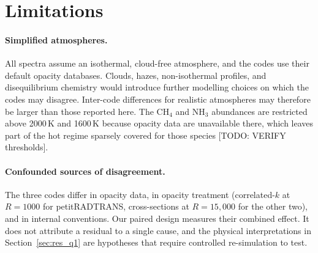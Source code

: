 



\section{Limitations}
\label{sec:limitations}

\paragraph{Simplified atmospheres.}
All spectra assume an isothermal, cloud-free atmosphere, and the codes use their default opacity databases.
Clouds, hazes, non-isothermal profiles, and disequilibrium chemistry would introduce further modelling choices on which the codes may disagree.
Inter-code differences for realistic atmospheres may therefore be larger than those reported here.
The CH$_4$ and NH$_3$ abundances are restricted above 2000\,K and 1600\,K because opacity data are unavailable there, which leaves part of the hot regime sparsely covered for those species [TODO: VERIFY thresholds].

\paragraph{Confounded sources of disagreement.}
The three codes differ in opacity data, in opacity treatment (correlated-$k$ at $R=1000$ for petitRADTRANS, cross-sections at $R=15{,}000$ for the other two), and in internal conventions.
Our paired design measures their combined effect.
It does not attribute a residual to a single cause, and the physical interpretations in Section~\ref{sec:res_q1} are hypotheses that require controlled re-simulation to test.


